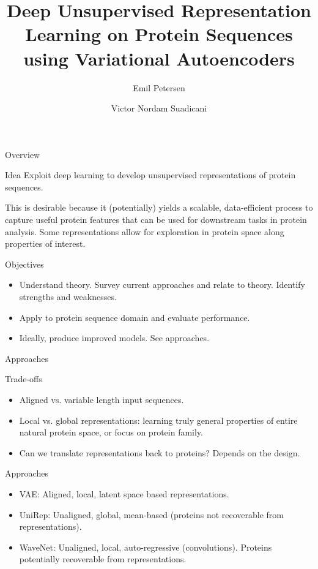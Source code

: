 \documentclass[dvipsnames]{beamer}
\title{\large Deep Unsupervised Representation Learning on Protein
Sequences using Variational Autoencoders}
\author{{Emil Petersen} \and {Victor Nordam Suadicani}}
\begin{document}
\frame{\titlepage}

\begin{frame}{Overview}

\begin{block}{Idea}
Exploit deep learning to develop unsupervised representations of protein sequences.

This is desirable because it (potentially) yields a scalable, data-efficient process to capture useful protein features that can be used for downstream tasks in protein analysis. Some representations allow for exploration in protein space along properties of interest.
\end{block}

\begin{block}{Objectives}
\begin{itemize}
    \item Understand theory. Survey current approaches and relate to theory. Identify strengths and weaknesses.
    \item Apply to protein sequence domain and evaluate performance.
    \item Ideally, produce improved models. See approaches.
\end{itemize}
\end{block}
\end{frame}

\begin{frame}{Approaches}
    \begin{block}{Trade-offs}
    \begin{itemize}
        \item Aligned vs. variable length input sequences.
        \item Local vs. global representations: learning truly general properties of entire natural protein space, or focus on protein family.
        \item Can we translate representations back to proteins? Depends on the design.
    \end{itemize}
    \end{block}
    
    \begin{block}{Approaches}
    \begin{itemize}
        \item VAE: Aligned, local, latent space based representations.
        \item UniRep: Unaligned, global, mean-based (proteins not recoverable from representations).
        \item WaveNet: Unaligned, local, auto-regressive (convolutions). Proteins potentially recoverable from representations.
    \end{itemize}
    \end{block}
\end{frame}
\end{document}
